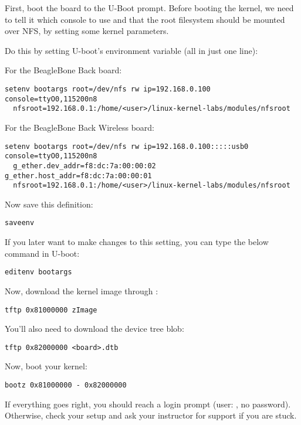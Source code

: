 First, boot the board to the U-Boot prompt. Before booting the kernel,
we need to tell it which console to use and that the root filesystem
should be mounted over NFS, by setting some kernel parameters.

Do this by setting U-boot's  environment variable (all in
just one line):

For the BeagleBone Back board:
\begin{verbatim}
setenv bootargs root=/dev/nfs rw ip=192.168.0.100 console=ttyO0,115200n8
  nfsroot=192.168.0.1:/home/<user>/linux-kernel-labs/modules/nfsroot
\end{verbatim}

For the BeagleBone Back Wireless board:
\begin{verbatim}
setenv bootargs root=/dev/nfs rw ip=192.168.0.100:::::usb0 console=ttyO0,115200n8
  g_ether.dev_addr=f8:dc:7a:00:00:02 g_ether.host_addr=f8:dc:7a:00:00:01
  nfsroot=192.168.0.1:/home/<user>/linux-kernel-labs/modules/nfsroot
\end{verbatim}

Now save this definition:
\begin{verbatim}
saveenv
\end{verbatim}

If you later want to make changes to this setting, you can type the
below command in U-boot:

\begin{verbatim}
editenv bootargs
\end{verbatim}

Now, download the kernel image through :

\begin{verbatim}
tftp 0x81000000 zImage
\end{verbatim}

You'll also need to download the device tree blob:

\begin{verbatim}
tftp 0x82000000 <board>.dtb
\end{verbatim}

Now, boot your kernel:

\begin{verbatim}
bootz 0x81000000 - 0x82000000
\end{verbatim}

If everything goes right, you should reach a login prompt (user:
, no password). Otherwise, check your setup and
ask your instructor for support if you are stuck.

